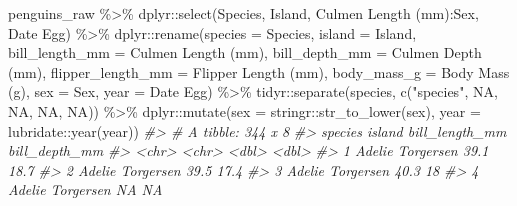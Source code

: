 \documentclass[
]{book}
\newenvironment{Shaded}{\begin{snugshade}}{\end{snugshade}}
\newcommand{\AttributeTok}[1]{\textcolor[rgb]{0.77,0.63,0.00}{#1}}
\newcommand{\CommentTok}[1]{\textcolor[rgb]{0.56,0.35,0.01}{\textit{#1}}}
\newcommand{\ConstantTok}[1]{\textcolor[rgb]{0.00,0.00,0.00}{#1}}
\newcommand{\FunctionTok}[1]{\textcolor[rgb]{0.00,0.00,0.00}{#1}}
\newcommand{\NormalTok}[1]{#1}
\newcommand{\SpecialCharTok}[1]{\textcolor[rgb]{0.00,0.00,0.00}{#1}}
\newcommand{\StringTok}[1]{\textcolor[rgb]{0.31,0.60,0.02}{#1}}
\begin{document}
\begin{Shaded}
\begin{Highlighting}[]
\NormalTok{penguins\_raw }\SpecialCharTok{\%\textgreater{}\%} 
\NormalTok{    dplyr}\SpecialCharTok{::}\FunctionTok{select}\NormalTok{(Species, Island, }\StringTok{\textasciigrave{}}\AttributeTok{Culmen Length (mm)}\StringTok{\textasciigrave{}}\SpecialCharTok{:}\NormalTok{Sex, }\StringTok{\textasciigrave{}}\AttributeTok{Date Egg}\StringTok{\textasciigrave{}}\NormalTok{) }\SpecialCharTok{\%\textgreater{}\%} 
\NormalTok{    dplyr}\SpecialCharTok{::}\FunctionTok{rename}\NormalTok{(}\AttributeTok{species =}\NormalTok{ Species,}
                  \AttributeTok{island =}\NormalTok{ Island,}
                  \AttributeTok{bill\_length\_mm =} \StringTok{\textasciigrave{}}\AttributeTok{Culmen Length (mm)}\StringTok{\textasciigrave{}}\NormalTok{,}
                  \AttributeTok{bill\_depth\_mm =} \StringTok{\textasciigrave{}}\AttributeTok{Culmen Depth (mm)}\StringTok{\textasciigrave{}}\NormalTok{,}
                  \AttributeTok{flipper\_length\_mm =} \StringTok{\textasciigrave{}}\AttributeTok{Flipper Length (mm)}\StringTok{\textasciigrave{}}\NormalTok{,}
                  \AttributeTok{body\_mass\_g =} \StringTok{\textasciigrave{}}\AttributeTok{Body Mass (g)}\StringTok{\textasciigrave{}}\NormalTok{,}
                  \AttributeTok{sex =}\NormalTok{ Sex,}
                  \AttributeTok{year =} \StringTok{\textasciigrave{}}\AttributeTok{Date Egg}\StringTok{\textasciigrave{}}\NormalTok{) }\SpecialCharTok{\%\textgreater{}\%} 
\NormalTok{    tidyr}\SpecialCharTok{::}\FunctionTok{separate}\NormalTok{(species, }\FunctionTok{c}\NormalTok{(}\StringTok{"species"}\NormalTok{, }\ConstantTok{NA}\NormalTok{, }\ConstantTok{NA}\NormalTok{, }\ConstantTok{NA}\NormalTok{, }\ConstantTok{NA}\NormalTok{)) }\SpecialCharTok{\%\textgreater{}\%} 
\NormalTok{    dplyr}\SpecialCharTok{::}\FunctionTok{mutate}\NormalTok{(}\AttributeTok{sex =}\NormalTok{ stringr}\SpecialCharTok{::}\FunctionTok{str\_to\_lower}\NormalTok{(sex),}
                  \AttributeTok{year =}\NormalTok{ lubridate}\SpecialCharTok{::}\FunctionTok{year}\NormalTok{(year))}
\CommentTok{\#\textgreater{} \# A tibble: 344 x 8}
\CommentTok{\#\textgreater{}    species island    bill\_length\_mm bill\_depth\_mm}
\CommentTok{\#\textgreater{}    \textless{}chr\textgreater{}   \textless{}chr\textgreater{}              \textless{}dbl\textgreater{}         \textless{}dbl\textgreater{}}
\CommentTok{\#\textgreater{}  1 Adelie  Torgersen           39.1          18.7}
\CommentTok{\#\textgreater{}  2 Adelie  Torgersen           39.5          17.4}
\CommentTok{\#\textgreater{}  3 Adelie  Torgersen           40.3          18  }
\CommentTok{\#\textgreater{}  4 Adelie  Torgersen           NA            NA  }

\end{Highlighting}
\end{Shaded}
\end{document}
